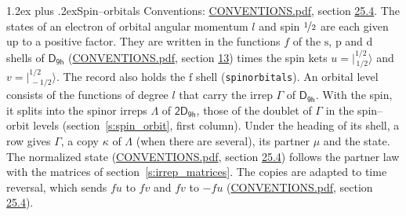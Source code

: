 \documentclass[10pt,a4paper]{article}
\makeatletter
\renewcommand\section{\@startsection{section}{1}{\z@}{-3ex plus -1ex minus -.2ex}%
  {1.2ex plus .2ex}{\normalfont\large\sffamily\bfseries\color{parttitle}}}
\numberwithin{equation}{section}
\newcommand{\grp}[1]{\mathsf{#1}}
\newcommand{\orbital}[1]{\mathrm{#1}}
\newcommand{\mult}{\kappa}
\newcommand{\intx}{\mu}
\newcommand{\jm}[2]{\bigl\lvert{}^{#1}_{\,#2}\bigr\rangle}
\makeatother
\begin{document}
\section{Spin--orbitals}\label{s:spin_orbitals}
Conventions: \href{../../CONVENTIONS.pdf}{CONVENTIONS.pdf}, section \href{../../CONVENTIONS.pdf\#conv.25.4}{25.4}.
\leavevmode\label{n:index.orbital.l}The states of an electron of orbital angular momentum $l$ and spin $\nicefrac{1}{2}$ are each given up to a positive factor. \label{n:local.spinor.uv}\label{n:local.function.f}They are written in the functions $f$ of the $\orbital{s}$, $\orbital{p}$ and $\orbital{d}$ shells of \href{../../../rotation/data/pdf/D9h.pdf}{$\grp{D_{9h}}$} (\href{../../CONVENTIONS.pdf}{CONVENTIONS.pdf}, section \href{../../../rotation/CONVENTIONS.pdf\#conv.13}{13}) times the spin kets $u = \jm{1/2}{1/2}$ and $v = \jm{1/2}{-1/2}$. The record also holds the $\orbital{f}$ shell (\texttt{spinorbitals}). An orbital level consists of the functions of degree $l$ that carry the irrep $\Gamma$ of \href{../../../rotation/data/pdf/D9h.pdf}{$\grp{D_{9h}}$}. With the spin, it splits into the spinor irreps $\Lambda$ of $\grp{2D_{9h}}$, those of the doublet of $\Gamma$ in the spin--orbit levels (section~\ref{s:spin_orbit}, first column). \label{n:head.state}Under the heading of its shell, a row gives $\Gamma$, a copy $\mult$ of $\Lambda$ (when there are several), its partner $\intx$ and the state. The normalized state (\href{../../CONVENTIONS.pdf}{CONVENTIONS.pdf}, section \href{../../CONVENTIONS.pdf\#conv.25.4}{25.4}) follows the partner law with the matrices of section~\ref{s:irrep_matrices}. The copies are adapted to time reversal, which sends $f u$ to $f v$ and $f v$ to $-f u$ (\href{../../CONVENTIONS.pdf}{CONVENTIONS.pdf}, section \href{../../CONVENTIONS.pdf\#conv.25.4}{25.4}).
\end{document}
